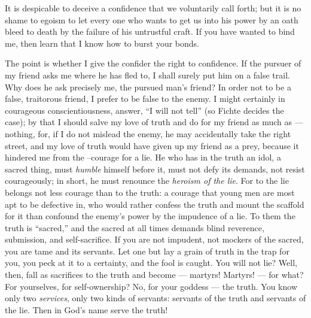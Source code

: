 It is despicable to deceive a confidence that we voluntarily call forth; but 
it is no shame to egoism to let every one who wants to get us into his power 
by an oath bleed to death by the failure of his untrustful craft. If you have 
wanted to bind me, then learn that I know how to burst your bonds.

The point is whether I give the confider the right to confidence. If the 
pursuer of my friend asks me where he has fled to, I shall surely put him on a 
false trail. Why does he ask precisely me, the pursued man's friend? In order 
not to be a false, traitorous friend, I prefer to be false to the enemy. I 
might certainly in courageous conscientiousness, answer, ``I will not tell'' 
(so Fichte decides the case); by that I should salve my love of truth and do 
for my friend as much as --- nothing, for, if I do not mislead the enemy, he 
may accidentally take the right street, and my love of truth would have given 
up my friend as a prey, because it hindered me from the --courage for a lie. 
He who has in the truth an idol, a sacred thing, must \textit{humble} himself 
before it, must not defy its demands, not resist courageously; in short, he 
must renounce the \textit{heroism of the lie}. For to the lie belongs not less 
courage than to the truth: a courage that young men are most apt to be 
defective in, who would rather confess the truth and mount the scaffold for it 
than confound the enemy's power by the impudence of a lie. To them the truth 
is ``sacred,'' and the sacred at all times demands blind reverence, 
submission, and self-sacrifice. If you are not impudent, not mockers of the 
sacred, you are tame and its servants. Let one but lay a grain of truth in the 
trap for you, you peck at it to a certainty, and the fool is caught. You will 
not lie? Well, then, fall as sacrifices to the truth and become --- martyrs! 
Martyrs! --- for what? For yourselves, for self-ownership? No, for your goddess --- the truth. You know only two \textit{services}, only two kinds of servants: 
servants of the truth and servants of the lie. Then in God's name serve the 
truth!

